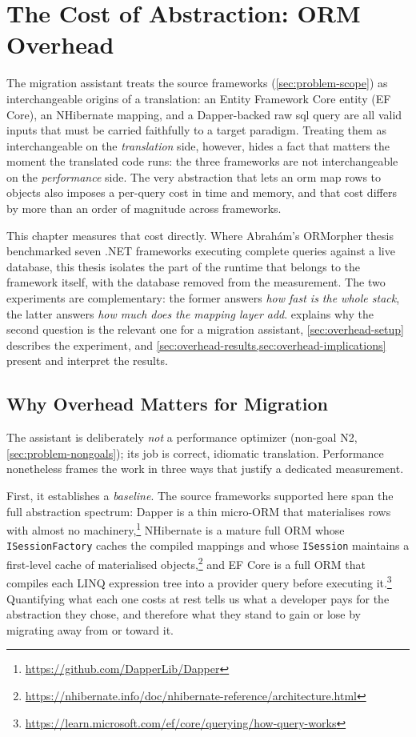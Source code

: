 \chapter{The Cost of Abstraction: ORM Overhead}
\label{chap:overhead}

The migration assistant treats the source frameworks (\cref{sec:problem-scope}) as interchangeable origins of a translation: an Entity Framework Core entity (EF Core), an NHibernate mapping, and a Dapper-backed raw \acrshort{sql} query are all valid inputs that must be carried faithfully to a target paradigm. Treating them as interchangeable on the \emph{translation} side, however, hides a fact that matters the moment the translated code runs: the three frameworks are not interchangeable on the \emph{performance} side. The very abstraction that lets an \acrshort{orm} map rows to objects also imposes a per-query cost in time and memory, and that cost differs by more than an order of magnitude across frameworks.

This chapter measures that cost directly. Where Abrahám's ORMorpher thesis~\cite{abrahamFrameworkAgnosticQueryAdaptation2025} benchmarked seven .NET frameworks executing complete queries against a live database, this thesis isolates the part of the runtime that belongs to the framework itself, with the database removed from the measurement. The two experiments are complementary: the former answers \emph{how fast is the whole stack}, the latter answers \emph{how much does the mapping layer add}.  explains why the second question is the relevant one for a migration assistant, \cref{sec:overhead-setup} describes the experiment, and \cref{sec:overhead-results,sec:overhead-implications} present and interpret the results.

\section{Why Overhead Matters for Migration}
\label{sec:overhead-motivation}

The assistant is deliberately \emph{not} a performance optimizer (non-goal N2, \cref{sec:problem-nongoals}); its job is correct, idiomatic translation. Performance nonetheless frames the work in three ways that justify a dedicated measurement.

First, it establishes a \emph{baseline}. The source frameworks supported here span the full abstraction spectrum: Dapper is a thin micro-ORM that materialises rows with almost no machinery,\footnote{\url{https://github.com/DapperLib/Dapper}} NHibernate is a mature full ORM whose \texttt{ISessionFactory} caches the compiled mappings and whose \texttt{ISession} maintains a first-level cache of materialised objects,\footnote{\url{https://nhibernate.info/doc/nhibernate-reference/architecture.html}} and EF Core is a full ORM that compiles each LINQ expression tree into a provider query before executing it.\footnote{\url{https://learn.microsoft.com/ef/core/querying/how-query-works}} Quantifying what each one costs at rest tells us what a developer pays for the abstraction they chose, and therefore what they stand to gain or lose by migrating away from or toward it.

